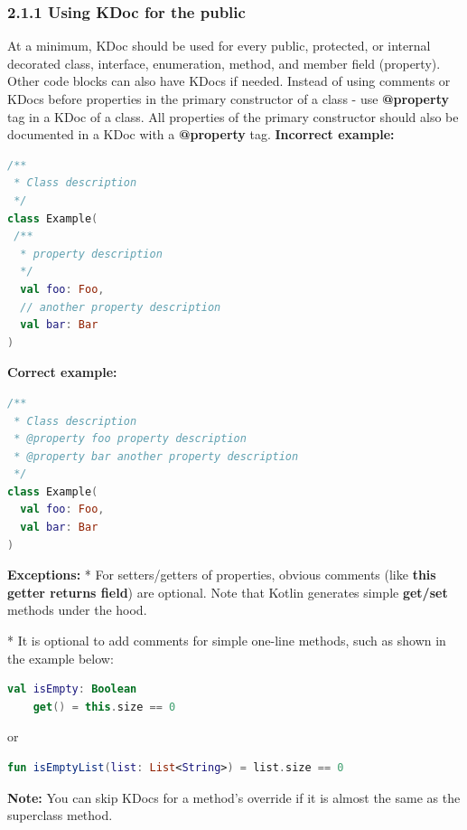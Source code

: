\subsubsection*{\textbf{2.1.1 Using KDoc for the public}}
\leavevmode\newline
\label{sec:2.1.1}
At a minimum, KDoc should be used for every public, protected, or internal decorated class, interface, enumeration, method, and member field (property).
Other code blocks can also have KDocs if needed.
Instead of using comments or KDocs before properties in the primary constructor of a class - use \textbf{@property} tag in a KDoc of a class.
All properties of the primary constructor should also be documented in a KDoc with a \textbf{@property} tag.
\textbf{Incorrect example:}
\begin{lstlisting}[language=Kotlin]
/**
 * Class description
 */
class Example(
 /**
  * property description
  */
  val foo: Foo,
  // another property description
  val bar: Bar
)
\end{lstlisting}
\textbf{Correct example:}
\begin{lstlisting}[language=Kotlin]
/**
 * Class description
 * @property foo property description
 * @property bar another property description
 */
class Example(
  val foo: Foo,
  val bar: Bar
)
\end{lstlisting}
\textbf{Exceptions:}
* For setters/getters of properties, obvious comments (like \textbf{this getter returns field}) are optional. Note that Kotlin generates simple \textbf{get/set} methods under the hood.
   
* It is optional to add comments for simple one-line methods, such as shown in the example below:
\begin{lstlisting}[language=Kotlin]
val isEmpty: Boolean
    get() = this.size == 0
\end{lstlisting}
or
\begin{lstlisting}[language=Kotlin]
fun isEmptyList(list: List<String>) = list.size == 0
\end{lstlisting}
\textbf{Note:} You can skip KDocs for a method's override if it is almost the same as the superclass method.
